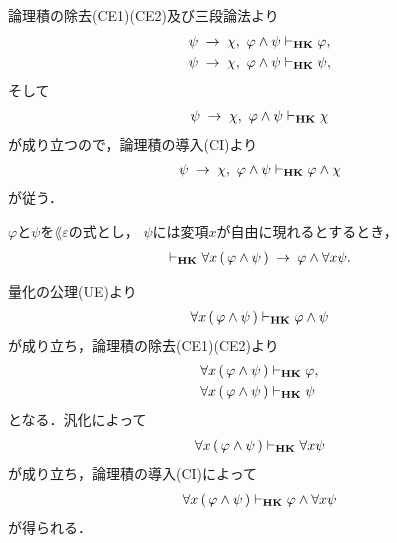 	\begin{sketch}
		論理積の除去(CE1)(CE2)及び三段論法より
		\begin{align}
			\psi \hspace{0.25em}\rightarrow\hspace{0.25em} \chi,\ \varphi \wedge \psi &\vdash_{{\scriptsize \mbox{{\bf HK}}}} \varphi, \\
			\psi \hspace{0.25em}\rightarrow\hspace{0.25em} \chi,\ \varphi \wedge \psi &\vdash_{{\scriptsize \mbox{{\bf HK}}}} \psi,
		\end{align}
		そして
		\begin{align}
			\psi \hspace{0.25em}\rightarrow\hspace{0.25em} \chi,\ \varphi \wedge \psi \vdash_{{\scriptsize \mbox{{\bf HK}}}} \chi
		\end{align}
		が成り立つので，論理積の導入(CI)より
		\begin{align}
			\psi \hspace{0.25em}\rightarrow\hspace{0.25em} \chi,\ \varphi \wedge \psi \vdash_{{\scriptsize \mbox{{\bf HK}}}} \varphi \wedge \chi
		\end{align}
		が従う．
		\QED
	\end{sketch}
	
	\begin{screen}
		\begin{thm}[論理積と全称の交換]
		\label{classic:commutation_of_conjunction_and_universal_quantifier}
			$\varphi$と$\psi$を$\lang{\varepsilon}$の式とし，
			$\psi$には変項$x$が自由に現れるとするとき，
			\begin{align}
				\vdash_{{\scriptsize \mbox{{\bf HK}}}} \forall x\, (\, \varphi \wedge \psi\, )
				\hspace{0.25em}\rightarrow\hspace{0.25em} \varphi \wedge \forall x \psi.
			\end{align}
		\end{thm}
	\end{screen}
	
	\begin{sketch}
		量化の公理(UE)より
		\begin{align}
			\forall x\, (\, \varphi \wedge \psi\, ) \vdash_{{\scriptsize \mbox{{\bf HK}}}} 
			\varphi \wedge \psi
		\end{align}
		が成り立ち，論理積の除去(CE1)(CE2)より
		\begin{align}
			\forall x\, (\, \varphi \wedge \psi\, ) &\vdash_{{\scriptsize \mbox{{\bf HK}}}} \varphi, \\
			\forall x\, (\, \varphi \wedge \psi\, ) &\vdash_{{\scriptsize \mbox{{\bf HK}}}} \psi
		\end{align}
		となる．汎化によって
		\begin{align}
			\forall x\, (\, \varphi \wedge \psi\, ) \vdash_{{\scriptsize \mbox{{\bf HK}}}} 
			\forall x \psi
		\end{align}
		が成り立ち，論理積の導入(CI)によって
		\begin{align}
			\forall x\, (\, \varphi \wedge \psi\, ) \vdash_{{\scriptsize \mbox{{\bf HK}}}} 
			\varphi \wedge \forall x \psi
		\end{align}
		が得られる．
		\QED
	\end{sketch}
	
